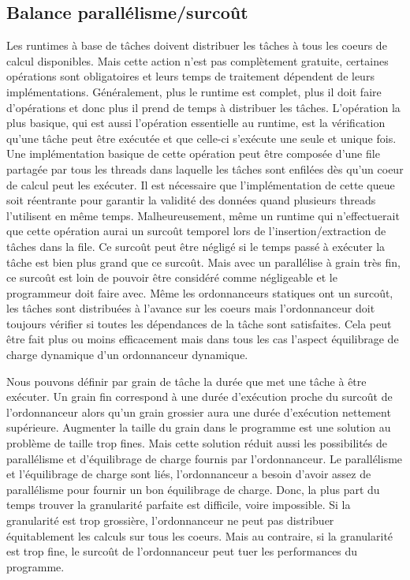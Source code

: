 \subsection{Balance parallélisme/surcoût}
Les runtimes à base de tâches doivent distribuer les tâches à tous les coeurs de calcul disponibles.
%
Mais cette action n'est pas complètement gratuite, certaines opérations sont obligatoires et leurs temps de traitement dépendent de leurs implémentations.
%
Généralement, plus le runtime est complet, plus il doit faire d'opérations et donc plus il prend de temps à distribuer les tâches.
%
L'opération la plus basique, qui est aussi l'opération essentielle au runtime, est la vérification qu'une tâche peut être exécutée et que celle-ci s'exécute une seule et unique fois.
%
Une implémentation basique de cette opération peut être composée d'une file partagée par tous les threads dans laquelle les tâches sont enfilées dès qu'un coeur de calcul peut les exécuter.
%
Il est nécessaire que l'implémentation de cette queue soit réentrante pour garantir la validité des données quand plusieurs threads l'utilisent en même temps.
%
Malheureusement, même un runtime qui n'effectuerait que cette opération aurai un surcoût temporel lors de l'insertion/extraction de tâches dans la file.
%
Ce surcoût peut être négligé si le temps passé à exécuter la tâche est bien plus grand que ce surcoût.
%
Mais avec un parallélise à grain très fin, ce surcoût est loin de pouvoir être considéré comme négligeable et le programmeur doit faire avec.
%
Même les ordonnanceurs statiques ont un surcoût, les tâches sont distribuées à l'avance sur les coeurs mais l'ordonnanceur doit toujours vérifier si toutes les dépendances de la tâche sont satisfaites.
%
Cela peut être fait plus ou moins efficacement mais dans tous les cas l'aspect équilibrage de charge dynamique d'un ordonnanceur dynamique.


Nous pouvons définir par grain de tâche la durée que met une tâche à être exécuter.
%
Un grain fin correspond à une durée d'exécution proche du surcoût de l'ordonnanceur alors qu'un grain grossier aura une durée d'exécution nettement supérieure.
%
Augmenter la taille du grain dans le programme est une solution au problème de taille trop fines.
%
Mais cette solution réduit aussi les possibilités de parallélisme et d'équilibrage de charge fournis par l'ordonnanceur.
%
Le parallélisme et l'équilibrage de charge sont liés, l'ordonnanceur a besoin d'avoir assez de parallélisme pour fournir un bon équilibrage de charge.
%
Donc, la plus part du temps trouver la granularité parfaite est difficile, voire impossible.
%
Si la granularité est trop grossière, l'ordonnanceur ne peut pas distribuer équitablement les calculs sur tous les coeurs.
%
Mais au contraire, si la granularité est trop fine, le surcoût de l'ordonnanceur peut tuer les performances du programme.


